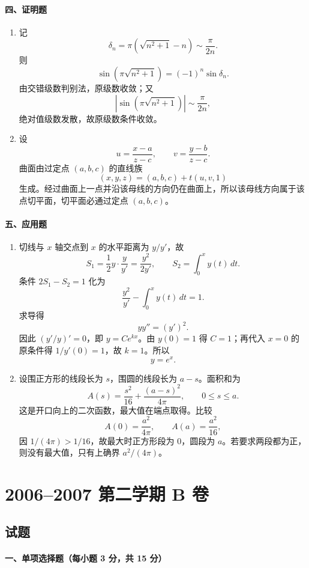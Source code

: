 \paragraph{四、证明题}
\begin{enumerate}
  \item 记
  \[
  \delta_n=\pi\left(\sqrt{n^2+1}-n\right)\sim\frac{\pi}{2n}.
  \]
  则
  \[
  \sin\left(\pi\sqrt{n^2+1}\right)
  =(-1)^n\sin\delta_n.
  \]
  由交错级数判别法，原级数收敛；又
  \[
  \left|\sin\left(\pi\sqrt{n^2+1}\right)\right|\sim\frac{\pi}{2n},
  \]
  绝对值级数发散，故原级数条件收敛。
  \item 设
  \[
  u=\frac{x-a}{z-c},\qquad v=\frac{y-b}{z-c}.
  \]
  曲面由过定点 $(a,b,c)$ 的直线族
  \[
  (x,y,z)=(a,b,c)+t(u,v,1)
  \]
  生成。经过曲面上一点并沿该母线的方向仍在曲面上，所以该母线方向属于该点切平面，切平面必通过定点 $(a,b,c)$。
\end{enumerate}

\paragraph{五、应用题}
\begin{enumerate}
  \item 切线与 $x$ 轴交点到 $x$ 的水平距离为 $y/y'$，故
  \[
  S_1=\frac12y\cdot\frac{y}{y'}=\frac{y^2}{2y'},\qquad
  S_2=\int_0^x y(t)\,dt.
  \]
  条件 $2S_1-S_2=1$ 化为
  \[
  \frac{y^2}{y'}-\int_0^xy(t)\,dt=1.
  \]
  求导得
  \[
  yy''=(y')^2.
  \]
  因此 $(y'/y)'=0$，即 $y=Ce^{kx}$。由 $y(0)=1$ 得 $C=1$；再代入 $x=0$ 的原条件得 $1/y'(0)=1$，故 $k=1$。所以
  \[
  y=e^x.
  \]
  \item 设围正方形的线段长为 $s$，围圆的线段长为 $a-s$。面积和为
  \[
  A(s)=\frac{s^2}{16}+\frac{(a-s)^2}{4\pi},\qquad 0\le s\le a.
  \]
  这是开口向上的二次函数，最大值在端点取得。比较
  \[
  A(0)=\frac{a^2}{4\pi},\qquad A(a)=\frac{a^2}{16},
  \]
  因 $1/(4\pi)>1/16$，故最大时正方形段为 $0$，圆段为 $a$。若要求两段都为正，则没有最大值，只有上确界 $a^2/(4\pi)$。
\end{enumerate}

\section{2006--2007 第二学期 B 卷}

\subsection{试题}

\paragraph{一、单项选择题（每小题 3 分，共 15 分）}

